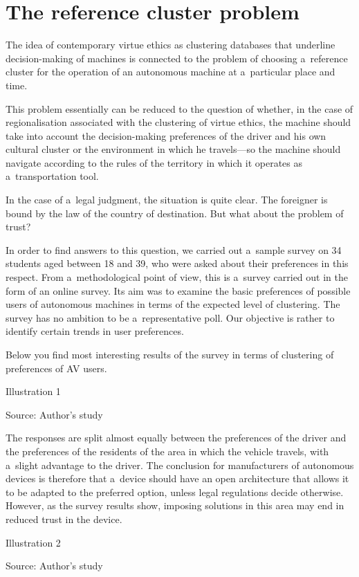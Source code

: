 \section*{The reference cluster problem}
The idea of contemporary virtue ethics as clustering databases that underline decision-making of machines is connected to the problem of choosing a~reference cluster for the operation of an autonomous machine at a~particular place and time.

This problem essentially can be reduced to the question of whether, in the case of regionalisation associated with the clustering of virtue ethics, the machine should take into account the decision-making preferences of the driver and his own cultural cluster or the environment in which he travels—so the machine should navigate according to the rules of the territory in which it operates as a~transportation tool.

In the case of a~legal judgment, the situation is quite clear. The foreigner is bound by the law of the country of destination. But what about the problem of trust?

In order to find answers to this question, we carried out a~sample survey on 34 students aged between 18 and 39, who were asked about their preferences in this respect. From a~methodological point of view, this is a~survey carried out in the form of an online survey. Its aim was to examine the basic preferences of possible users of autonomous machines in terms of the expected level of clustering. The survey has no ambition to be a~representative poll. Our objective is rather to identify certain trends in user preferences.

Below you find most interesting results of the survey in terms of clustering of preferences of AV users.

Illustration 1

Source: Author's study

The responses are split almost equally between the preferences of the driver and the preferences of the residents of the area in which the vehicle travels, with a~slight advantage to the driver. The conclusion for manufacturers of autonomous devices is therefore that a~device should have an open architecture that allows it to be adapted to the preferred option, unless legal regulations decide otherwise. However, as the survey results show, imposing solutions in this area may end in reduced trust in the device.

Illustration 2

Source: Author's study

